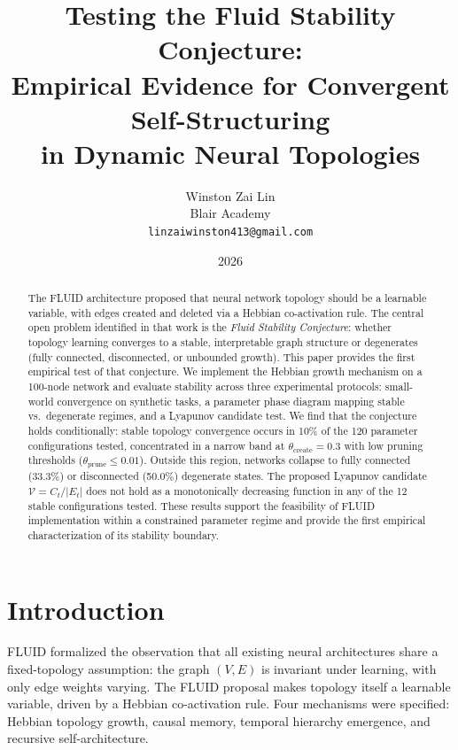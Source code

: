 \documentclass[12pt]{article}
\title{\textbf{Testing the Fluid Stability Conjecture:\\
Empirical Evidence for Convergent Self-Structuring\\
in Dynamic Neural Topologies}}
\author{
    Winston Zai Lin \\
    \small Blair Academy \\
    \small \texttt{linzaiwinston413@gmail.com}
}
\date{2026}
\begin{document}
\maketitle

\begin{abstract}
The FLUID architecture \cite{lin2026fluid} proposed that neural network topology should be a learnable variable, with edges created and deleted via a Hebbian co-activation rule. The central open problem identified in that work is the \textit{Fluid Stability Conjecture}: whether topology learning converges to a stable, interpretable graph structure or degenerates (fully connected, disconnected, or unbounded growth). This paper provides the first empirical test of that conjecture. We implement the Hebbian growth mechanism on a 100-node network and evaluate stability across three experimental protocols: small-world convergence on synthetic tasks, a parameter phase diagram mapping stable vs.\ degenerate regimes, and a Lyapunov candidate test. We find that the conjecture holds conditionally: stable topology convergence occurs in 10\% of the 120 parameter configurations tested, concentrated in a narrow band at $\theta_{\text{create}} = 0.3$ with low pruning thresholds ($\theta_{\text{prune}} \leq 0.01$). Outside this region, networks collapse to fully connected (33.3\%) or disconnected (50.0\%) degenerate states. The proposed Lyapunov candidate $\mathcal{V} = C_t / |E_t|$ does not hold as a monotonically decreasing function in any of the 12 stable configurations tested. These results support the feasibility of FLUID implementation within a constrained parameter regime and provide the first empirical characterization of its stability boundary.
\end{abstract}

\section{Introduction}

FLUID \cite{lin2026fluid} formalized the observation that all existing neural architectures share a fixed-topology assumption: the graph $(V, E)$ is invariant under learning, with only edge weights varying. The FLUID proposal makes topology itself a learnable variable, driven by a Hebbian co-activation rule. Four mechanisms were specified: Hebbian topology growth, causal memory, temporal hierarchy emergence, and recursive self-architecture.
\end{document}
